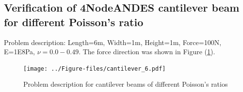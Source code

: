 \documentclass[fleqn,11pt]{article}
\begin{document}













\newpage
\subsection{Verification of 4NodeANDES cantilever beam for different Poisson's ratio}




Problem description: Length=6m, Width=1m, Height=1m, Force=100N, E=1E8Pa, $\nu=0.0-0.49$. The force direction was shown in Figure (\ref{fig Problem description for cantilever beams of different Poisson's 4}). 

\begin{figure}[H]
  \centering
  \texttt{[image: ../Figure-files/cantilever\_6.pdf]}
  \caption{Problem description for cantilever beams of different Poisson's ratios}
  \label{fig Problem description for cantilever beams of different Poisson's 4}
\end{figure}
\end{document}
